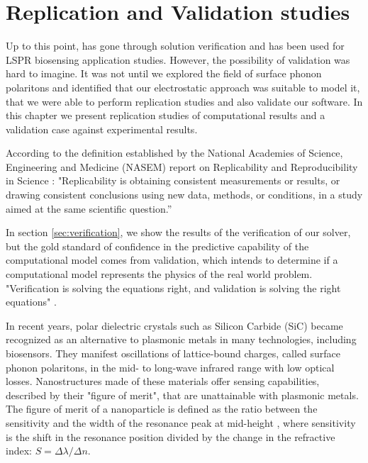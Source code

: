 
\chapter{Replication and Validation studies}

Up to this point, \pygbe has gone through solution verification and has been used for 
LSPR biosensing application studies. However, the possibility of validation was hard to imagine. It was not
until we explored the field of surface phonon polaritons and identified that our electrostatic approach was suitable to model it, 
that we were able to perform replication studies and also validate our software. In this chapter we present replication 
studies of computational results and a validation case against experimental results. 

According to the definition established by the National Academies of Science, Engineering 
and Medicine (NASEM) report on Replicability and Reproducibility in Science \cite{NASEM2019}: "Replicability is obtaining 
consistent measurements or results, or drawing consistent conclusions using new data, methods, or conditions, in a
study aimed at the same scientific question.” 

In section \ref{sec:verification}, we show the results of the verification of our 
solver, but the gold standard of confidence in the predictive capability of the computational model comes from validation, which 
intends to determine if a computational model represents the physics of the real world problem. "Verification is solving the equations
right, and validation is solving the right equations" \cite{Roache1998}. 

In recent years, polar dielectric crystals such as Silicon Carbide (SiC) became recognized as an alternative to 
plasmonic metals in many technologies, including biosensors. They manifest oscillations of lattice-bound charges, called surface 
phonon polaritons, in the mid- to long-wave infrared range with low optical losses. Nanostructures made of these materials offer sensing 
capabilities, described by their "figure of merit", that are unattainable with plasmonic metals. The figure of merit of a nanoparticle
is defined as the ratio between the sensitivity and the width of the resonance peak at mid-height \cite{otte2012}, where 
sensitivity is the shift in the resonance position divided by the change in the refractive index: 
$S = \Delta \lambda / \Delta n$. 

